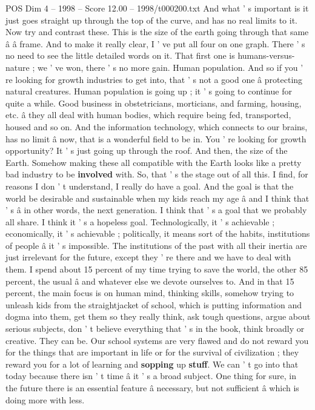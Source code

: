 \begin{textsample}{POS Dim 4 – 1998 – Score 12.00 – 1998/t000200.txt}
And what ' s important is it just goes straight up through the top of the curve, and has no real limits to it.
Now try and contrast these.
This is the size of the earth going through that same â â frame.
And to make it really clear, I ' ve put all four on one graph.
There ' s no need to see the little detailed words on it.
That first one is humans-versus-nature ; we ' ve won, there ' s no more gain.
Human population.
And so if you ' re looking for growth industries to get into, that ' s not a good one â protecting natural creatures.
Human population is going up ; it ' s going to continue for quite a while.
Good business in obstetricians, morticians, and farming, housing, etc. â they all deal with human bodies, which require being fed, transported, housed and so on.
And the information technology, which connects to our brains, has no limit â now, that is a wonderful field to be in.
You ' re looking for growth opportunity?
It ' s just going up through the roof.
And then, the size of the Earth.
Somehow making these all compatible with the Earth looks like a pretty bad industry to be \textbf{involved} with.
So, that ' s the stage out of all this.
I find, for reasons I don ' t understand, I really do have a goal.
And the goal is that the world be desirable and sustainable when my kids reach my age â and I think that ' s â in other words, the next generation.
I think that ' s a goal that we probably all share.
I think it ' s a hopeless goal.
Technologically, it ' s achievable ; economically, it ' s achievable ; politically, it means sort of the habits, institutions of people â it ' s impossible.
The institutions of the past with all their inertia are just irrelevant for the future, except they ' re there and we have to deal with them.
I spend about 15 percent of my time trying to save the world, the other 85 percent, the usual â and whatever else we devote ourselves to.
And in that 15 percent, the main focus is on human mind, thinking skills, somehow trying to unleash kids from the straightjacket of school, which is putting information and dogma into them, get them so they really think, ask tough questions, argue about serious subjects, don ' t believe everything that ' s in the book, think broadly or creative.
They can be.
Our school systems are very flawed and do not reward you for the things that are important in life or for the survival of civilization ; they reward you for a lot of learning and \textbf{sopping} up \textbf{stuff}.
We can ' t go into that today because there isn ' t time â it ' s a broad subject.
One thing for sure, in the future there is an essential feature â necessary, but not sufficient â which is doing more with less.

\end{textsample}
